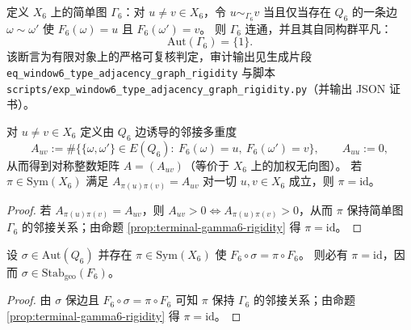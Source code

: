 \begin{enumerate}
  \begin{proposition}[类型邻接图刚性消除“重标号自由度”：\texorpdfstring{$\mathrm{Aut}(\Gamma_6)=\{1\}$}{Aut(Gamma6)=1}]\label{prop:terminal-gamma6-rigidity}
  定义 \(X_6\) 上的简单图 \(\Gamma_6\)：对 \(u\neq v\in X_6\)，令 \(u\sim_{\Gamma_6} v\) 当且仅当存在 \(Q_6\) 的一条边 \(\omega\sim\omega'\) 使
  \(F_6(\omega)=u\) 且 \(F_6(\omega')=v\)。
  则 \(\Gamma_6\) 连通，并且其自同构群平凡：
  \[
  \mathrm{Aut}(\Gamma_6)=\{1\}.
  \]
  该断言为有限对象上的严格可复核判定，审计输出见生成片段 \texttt{eq\_window6\_type\_adjacency\_graph\_rigidity} 与脚本 \texttt{scripts/exp\_window6\_type\_adjacency\_graph\_rigidity.py}（并输出 JSON 证书）。
  \end{proposition}
  

  \begin{corollary}\label{cor:terminal-gamma6-multiplicity-rigidity}
  对 \(u\neq v\in X_6\) 定义由 \(Q_6\) 边诱导的邻接多重度
  \[
  A_{uv}
  :=\#\bigl\{\{\omega,\omega'\}\in E(Q_6):\ F_6(\omega)=u,\ F_6(\omega')=v\bigr\},
  \qquad A_{uu}:=0,
  \]
  从而得到对称整数矩阵 \(A=(A_{uv})\)（等价于 \(X_6\) 上的加权无向图）。
  若 \(\pi\in\mathrm{Sym}(X_6)\) 满足 \(A_{\pi(u)\pi(v)}=A_{uv}\) 对一切 \(u,v\in X_6\) 成立，则 \(\pi=\mathrm{id}\)。
  \begin{proof}
  若 \(A_{\pi(u)\pi(v)}=A_{uv}\)，则 \(A_{uv}>0\iff A_{\pi(u)\pi(v)}>0\)，从而 \(\pi\) 保持简单图 \(\Gamma_6\) 的邻接关系；由命题 \ref{prop:terminal-gamma6-rigidity} 得 \(\pi=\mathrm{id}\)。
  \end{proof}
  \end{corollary}

  \begin{corollary}[几何自同构不诱导类型重标号]\label{cor:terminal-foldbin6-no-type-relabeling-by-geo}
  设 \(\sigma\in \mathrm{Aut}(Q_6)\) 并存在 \(\pi\in\mathrm{Sym}(X_6)\) 使
  \(
  F_6\circ\sigma=\pi\circ F_6
  \)。
  则必有 \(\pi=\mathrm{id}\)，因而 \(\sigma\in \mathrm{Stab}_{\mathrm{geo}}(F_6)\)。
  \begin{proof}
  由 \(\sigma\) 保边且 \(F_6\circ\sigma=\pi\circ F_6\) 可知 \(\pi\) 保持 \(\Gamma_6\) 的邻接关系；由命题 \ref{prop:terminal-gamma6-rigidity} 得 \(\pi=\mathrm{id}\)。
  \end{proof}
  \end{corollary}


\end{enumerate}
